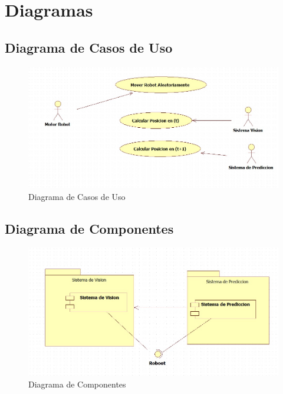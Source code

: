 
\chapter{Diagramas}
\section{Diagrama de Casos de Uso}
\begin{figure}
	\centering
	\includegraphics[width=4.5in]{imagen9.jpg}
	
	\caption{Diagrama de Casos de Uso}
	\label{fig_mar}
\end{figure}
\section{Diagrama de Componentes}
\begin{figure}
	\centering
	\includegraphics[width=4.5in]{imagen10.jpg}
	
	\caption{Diagrama de Componentes}
	\label{fig_mar}
\end{figure}


